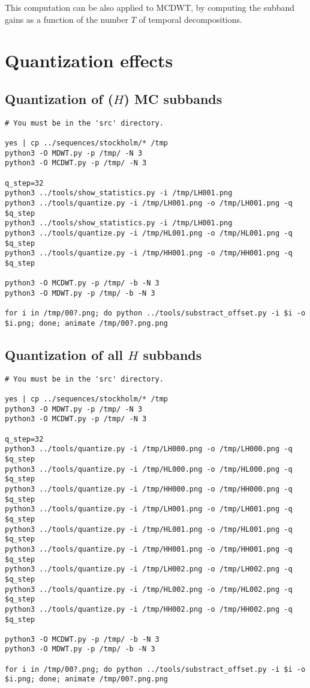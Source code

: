 This computation can be also applied to MCDWT, by computing the subband
gains as a function of the number $T$ of temporal decompositions.


\section{Quantization effects}
\subsection{Quantization of ($H$) MC subbands}
\begin{verbatim}
# You must be in the 'src' directory.

yes | cp ../sequences/stockholm/* /tmp
python3 -O MDWT.py -p /tmp/ -N 3
python3 -O MCDWT.py -p /tmp/ -N 3

q_step=32
python3 ../tools/show_statistics.py -i /tmp/LH001.png
python3 ../tools/quantize.py -i /tmp/LH001.png -o /tmp/LH001.png -q $q_step
python3 ../tools/show_statistics.py -i /tmp/LH001.png
python3 ../tools/quantize.py -i /tmp/HL001.png -o /tmp/HL001.png -q $q_step
python3 ../tools/quantize.py -i /tmp/HH001.png -o /tmp/HH001.png -q $q_step

python3 -O MCDWT.py -p /tmp/ -b -N 3
python3 -O MDWT.py -p /tmp/ -b -N 3

for i in /tmp/00?.png; do python ../tools/substract_offset.py -i $i -o $i.png; done; animate /tmp/00?.png.png
\end{verbatim}

\subsection{Quantization of all $H$ subbands}
\begin{verbatim}
# You must be in the 'src' directory.

yes | cp ../sequences/stockholm/* /tmp
python3 -O MDWT.py -p /tmp/ -N 3
python3 -O MCDWT.py -p /tmp/ -N 3

q_step=32
python3 ../tools/quantize.py -i /tmp/LH000.png -o /tmp/LH000.png -q $q_step
python3 ../tools/quantize.py -i /tmp/HL000.png -o /tmp/HL000.png -q $q_step
python3 ../tools/quantize.py -i /tmp/HH000.png -o /tmp/HH000.png -q $q_step
python3 ../tools/quantize.py -i /tmp/LH001.png -o /tmp/LH001.png -q $q_step
python3 ../tools/quantize.py -i /tmp/HL001.png -o /tmp/HL001.png -q $q_step
python3 ../tools/quantize.py -i /tmp/HH001.png -o /tmp/HH001.png -q $q_step
python3 ../tools/quantize.py -i /tmp/LH002.png -o /tmp/LH002.png -q $q_step
python3 ../tools/quantize.py -i /tmp/HL002.png -o /tmp/HL002.png -q $q_step
python3 ../tools/quantize.py -i /tmp/HH002.png -o /tmp/HH002.png -q $q_step

python3 -O MCDWT.py -p /tmp/ -b -N 3
python3 -O MDWT.py -p /tmp/ -b -N 3

for i in /tmp/00?.png; do python ../tools/substract_offset.py -i $i -o $i.png; done; animate /tmp/00?.png.png
\end{verbatim}

